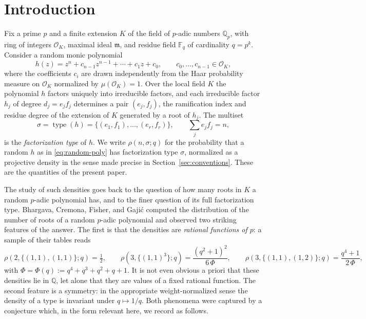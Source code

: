 \documentclass[pdflatex,sn-mathphys-num]{sn-jnl}%
\DeclareMathOperator{\type}{type}
\newcommand{\Qp}{\mathbb{Q}_p}
\newcommand{\OK}{\mathcal{O}_K}
\newcommand{\bbF}{\mathbb{F}}
\newcommand{\bbQ}{\mathbb{Q}}
\newcommand{\fkm}{\mathfrak{m}}
\theoremstyle{plain}
\theoremstyle{definition}
\theoremstyle{remark}
\numberwithin{equation}{section}
\begin{document}
\maketitle

\tableofcontents

\section{Introduction}\label{sec:intro}

Fix a prime $p$ and a finite extension $K$ of the field of $p$-adic numbers
$\Qp$, with ring of integers $\OK$, maximal ideal $\fkm$, and residue field
$\bbF_q$ of cardinality $q=p^{k}$. Consider a random monic polynomial
\begin{equation}\label{eq:random-poly}
  h(z)=z^{n}+c_{n-1}z^{n-1}+\cdots+c_{1}z+c_{0},\qquad c_{0},\dots,c_{n-1}\in\OK,
\end{equation}
where the coefficients $c_{i}$ are drawn independently from the Haar probability
measure on $\OK$ normalized by $\mu(\OK)=1$. Over the local field $K$ the
polynomial $h$ factors uniquely into irreducible factors, and each irreducible
factor $h_{j}$ of degree $d_{j}=e_{j}f_{j}$ determines a pair $(e_{j},f_{j})$,
the ramification index and residue degree of the extension of $K$ generated by a
root of $h_{j}$. The multiset
\[
  \sigma=\type(h)=\bigl\{(e_{1},f_{1}),\dots,(e_{r},f_{r})\bigr\},
  \qquad \sum_{j}e_{j}f_{j}=n,
\]
is the \emph{factorization type} of $h$. We write $\rho(n,\sigma;q)$ for the
probability that a random $h$ as in \eqref{eq:random-poly} has factorization type
$\sigma$, normalized as a projective density in the sense made precise in
Section~\ref{sec:conventions}. These are the quantities of the present paper.

The study of such densities goes back to the question of how many roots in $K$ a
random $p$-adic polynomial has, and to the finer question of its full
factorization type. Bhargava, Cremona, Fisher, and Gaji\'c
\cite{bhargava2022density} computed the distribution of the number of roots of a
random $p$-adic polynomial and observed two striking features of the answer. The
first is that the densities are \emph{rational functions of $p$}: a sample of
their tables reads
\begin{equation}\label{eq:bcfg-table}
  \rho(2,\{(1,1),(1,1)\};q)=\tfrac12,\qquad
  \rho(3,\{(1,1)^{3}\};q)=\frac{(q^{2}+1)^{2}}{6\,\Phi},\qquad
  \rho(3,\{(1,1),(1,2)\};q)=\frac{q^{4}+1}{2\,\Phi},
\end{equation}
with $\Phi=\Phi(q):=q^{4}+q^{3}+q^{2}+q+1$. It is not even obvious a priori that
these densities lie in $\bbQ$, let alone that they are values of a fixed rational
function. The second feature is a symmetry: in the appropriate weight-normalized
sense the density of a type is invariant under $q\mapsto 1/q$. Both phenomena were
captured by a conjecture which, in the form relevant here, we record as follows.
\end{document}
